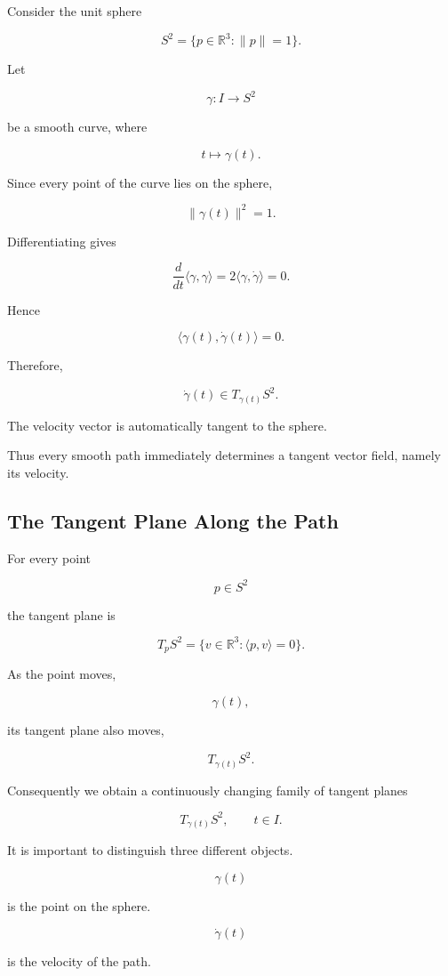 \documentclass[12pt,a4paper]{article}
\theoremstyle{notespace}
\begin{document}
Consider the unit sphere

\[
S^2=\{p\in\mathbb R^3:\|p\|=1\}.
\]

Let

\[
\gamma:I\rightarrow S^2
\]

be a smooth curve, where

\[
t\longmapsto\gamma(t).
\]

Since every point of the curve lies on the sphere,

\[
\|\gamma(t)\|^2=1.
\]

Differentiating gives

\[
\frac{d}{dt}\langle\gamma,\gamma\rangle
=
2\langle\gamma,\dot\gamma\rangle
=
0.
\]

Hence

\[
\boxed{\langle\gamma(t),\dot\gamma(t)\rangle=0.}
\]

Therefore,

\[
\boxed{\dot\gamma(t)\in T_{\gamma(t)}S^2.}
\]

The velocity vector is automatically tangent to the sphere.

Thus every smooth path immediately determines a tangent vector field,
namely its velocity.

\subsection{The Tangent Plane Along the Path}

For every point

\[
p\in S^2
\]

the tangent plane is

\[
T_pS^2
=
\{v\in\mathbb R^3:\langle p,v\rangle=0\}.
\]

As the point moves,

\[
\gamma(t),
\]

its tangent plane also moves,

\[
T_{\gamma(t)}S^2.
\]

Consequently we obtain a continuously changing family of tangent planes

\[
T_{\gamma(t)}S^2,
\qquad
t\in I.
\]

It is important to distinguish three different objects.

\[
\gamma(t)
\]

is the point on the sphere.

\[
\dot\gamma(t)
\]

is the velocity of the path.
\end{document}
